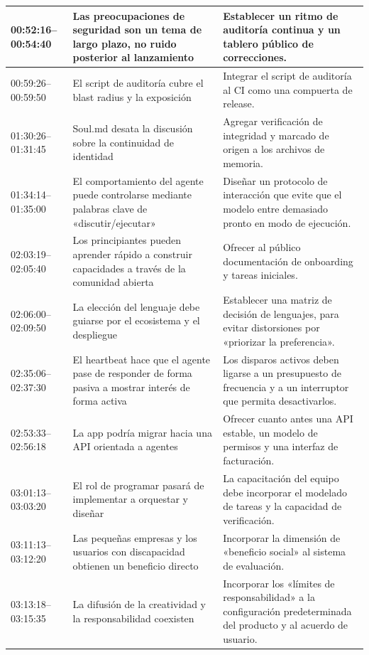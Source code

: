 \documentclass[a4paper]{article}
\begin{document}
\begin{longtable}{p{}p{}p{}}
\midrule
00:52:16--00:54:40 & Las preocupaciones de seguridad son un tema de largo plazo, no ruido posterior al lanzamiento & Establecer un ritmo de auditoría continua y un tablero público de correcciones. \\
\midrule
00:59:26--00:59:50 & El script de auditoría cubre el blast radius y la exposición & Integrar el script de auditoría al CI como una compuerta de release. \\
\midrule
01:30:26--01:31:45 & Soul.md desata la discusión sobre la continuidad de identidad & Agregar verificación de integridad y marcado de origen a los archivos de memoria. \\
\midrule
01:34:14--01:35:00 & El comportamiento del agente puede controlarse mediante palabras clave de «discutir/ejecutar» & Diseñar un protocolo de interacción que evite que el modelo entre demasiado pronto en modo de ejecución. \\
\midrule
02:03:19--02:05:40 & Los principiantes pueden aprender rápido a construir capacidades a través de la comunidad abierta & Ofrecer al público documentación de onboarding y tareas iniciales. \\
\midrule
02:06:00--02:09:50 & La elección del lenguaje debe guiarse por el ecosistema y el despliegue & Establecer una matriz de decisión de lenguajes, para evitar distorsiones por «priorizar la preferencia». \\
\midrule
02:35:06--02:37:30 & El heartbeat hace que el agente pase de responder de forma pasiva a mostrar interés de forma activa & Los disparos activos deben ligarse a un presupuesto de frecuencia y a un interruptor que permita desactivarlos. \\
\midrule
02:53:33--02:56:18 & La app podría migrar hacia una API orientada a agentes & Ofrecer cuanto antes una API estable, un modelo de permisos y una interfaz de facturación. \\
\midrule
03:01:13--03:03:20 & El rol de programar pasará de implementar a orquestar y diseñar & La capacitación del equipo debe incorporar el modelado de tareas y la capacidad de verificación. \\
\midrule
03:11:13--03:12:20 & Las pequeñas empresas y los usuarios con discapacidad obtienen un beneficio directo & Incorporar la dimensión de «beneficio social» al sistema de evaluación. \\
\midrule
03:13:18--03:15:35 & La difusión de la creatividad y la responsabilidad coexisten & Incorporar los «límites de responsabilidad» a la configuración predeterminada del producto y al acuerdo de usuario. \\
\bottomrule
\end{longtable}
\end{document}
